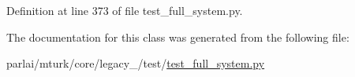 Definition at line 373 of file test\+\_\+full\+\_\+system.\+py.



The documentation for this class was generated from the following file\+:\begin{DoxyCompactItemize}
\item 
parlai/mturk/core/legacy\+\_/test/\hyperlink{legacy__2018_2test_2test__full__system_8py}{test\+\_\+full\+\_\+system.\+py}\end{DoxyCompactItemize}
